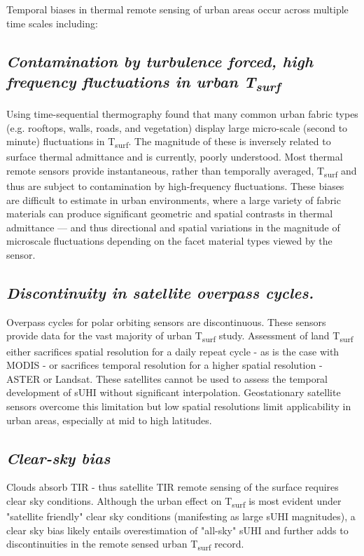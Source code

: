 \begin{bibunit}
Temporal biases in thermal remote sensing of urban areas occur across multiple time scales including: 
\subsection*{\textnormal{\textit{Contamination by turbulence forced, high frequency fluctuations in urban T\textsubscript{surf}}}}

Using time-sequential thermography \citet{Christen2012} found that many common urban fabric types (e.g. rooftops, walls, roads, and vegetation) display large micro-scale (second to minute) fluctuations in T\textsubscript{surf}. The magnitude of these is inversely related to surface thermal admittance and is currently, poorly understood. Most thermal remote sensors provide instantaneous, rather than temporally averaged, T\textsubscript{surf} and thus are subject to contamination by high-frequency fluctuations. These biases are difficult to estimate in urban environments, where a large variety of fabric materials can produce significant geometric and spatial contrasts in thermal admittance --- and thus directional and spatial variations in the magnitude of microscale fluctuations depending on the facet material types viewed by the sensor. 

\subsection*{\textnormal{\textit{Discontinuity in satellite overpass cycles.}}}

Overpass cycles for polar orbiting sensors are discontinuous. These sensors provide data for the vast majority of urban T\textsubscript{surf} study. Assessment of land T\textsubscript{surf} either sacrifices spatial resolution for a daily repeat cycle - as is the case with MODIS  - or sacrifices temporal resolution for a higher spatial resolution - ASTER or Landsat. These satellites cannot be used to assess the temporal development of sUHI without significant interpolation. Geostationary satellite sensors overcome this limitation but low spatial resolutions limit applicability in urban areas, especially at mid to high latitudes. 

\subsection*{\textnormal{\textit{Clear-sky bias}}}

Clouds absorb TIR - thus satellite TIR remote sensing of the surface requires clear sky conditions. Although the urban effect on T\textsubscript{surf} is most evident under "satellite friendly" clear sky conditions (manifesting as large sUHI magnitudes), a clear sky bias likely entails overestimation of "all-sky" sUHI and further adds to discontinuities in the remote sensed urban T\textsubscript{surf} record.


\end{bibunit}
